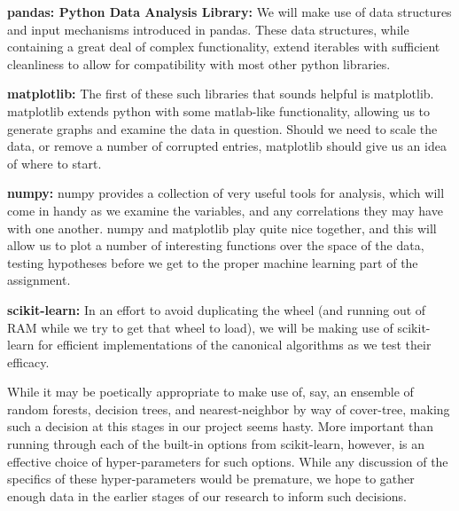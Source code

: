 \documentclass[10pt,a4paper]{article}
\begin{document}
\textbf{pandas: Python Data Analysis Library:}
We will make use of data structures and input mechanisms introduced in 
pandas.  These data structures, while containing a great deal of 
complex functionality, extend iterables with sufficient cleanliness to 
allow for compatibility with most other python libraries.

\textbf{matplotlib:} 
The first of these such libraries that sounds helpful is matplotlib.  
matplotlib extends python with some matlab-like functionality, allowing 
us to generate graphs and examine the data in question.  Should we need 
to scale the data, or remove a number of corrupted entries, matplotlib 
should give us an idea of where to start.

\textbf{numpy:}
numpy provides a collection of very useful tools for analysis, which 
will come in handy as we examine the variables, and any correlations 
they may have with one another.  numpy and matplotlib play quite nice 
together, and this will allow us to plot a number of interesting 
functions over the space of the data, testing hypotheses before we get 
to the proper machine learning part of the assignment.

\textbf{scikit-learn:}
In an effort to avoid duplicating the wheel (and running out of RAM 
while we try to get that wheel to load), we will be making use of 
scikit-learn for efficient implementations of the canonical algorithms 
as we test their efficacy.

While it may be poetically appropriate to make use of, say, an ensemble
of random forests, decision trees, and nearest-neighbor by way of
cover-tree, making such a decision at this stages in our project seems 
hasty.
More important than running through each of the built-in options from 
scikit-learn, however, is an effective choice of hyper-parameters for 
such options.  While any discussion of the specifics of these 
hyper-parameters would be premature, we hope to gather enough data in 
the earlier stages of our research to inform such decisions.
\end{document}
